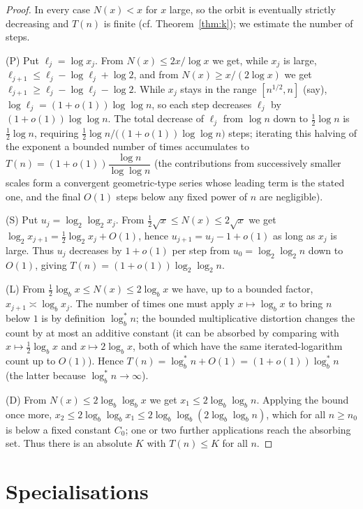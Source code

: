 \documentclass[12pt]{article}
\theoremstyle{definition}
\begin{document}
\begin{proof}
In every case $N(x)<x$ for $x$ large, so the orbit is eventually strictly decreasing
and $T(n)$ is finite (cf. Theorem~\ref{thm:k}); we estimate the number of steps.

(P) Put $\ell_j=\log x_j$. From $N(x)\le 2x/\log x$ we get, while $x_j$ is large,
$\ell_{j+1}\le \ell_j-\log\ell_j+\log2$, and from $N(x)\ge x/(2\log x)$ we get
$\ell_{j+1}\ge \ell_j-\log\ell_j-\log2$. While $x_j$ stays in the range
$[n^{1/2},n]$ (say), $\log\ell_j=(1+o(1))\log\log n$, so each step decreases
$\ell_j$ by $(1+o(1))\log\log n$. The total decrease of $\ell_j$ from $\log n$ down
to $\tfrac12\log n$ is $\tfrac12\log n$, requiring
$\tfrac12\log n/\bigl((1+o(1))\log\log n\bigr)$ steps; iterating this halving of the
exponent a bounded number of times accumulates to
$T(n)=(1+o(1))\dfrac{\log n}{\log\log n}$ (the contributions from successively smaller
scales form a convergent geometric-type series whose leading term is the stated one,
and the final $O(1)$ steps below any fixed power of $n$ are negligible).

(S) Put $u_j=\log_2\log_2 x_j$. From $\tfrac12\sqrt x\le N(x)\le2\sqrt x$ we get
$\log_2 x_{j+1}=\tfrac12\log_2 x_j+O(1)$, hence
$u_{j+1}=u_j-1+o(1)$ as long as $x_j$ is large. Thus $u_j$ decreases by $1+o(1)$ per
step from $u_0=\log_2\log_2 n$ down to $O(1)$, giving
$T(n)=(1+o(1))\log_2\log_2 n$.

(L) From $\tfrac12\log_b x\le N(x)\le2\log_b x$ we have, up to a bounded factor,
$x_{j+1}\asymp\log_b x_j$. The number of times one must apply $x\mapsto\log_b x$ to
bring $n$ below $1$ is by definition $\log^*_b n$; the bounded multiplicative
distortion changes the count by at most an additive constant (it can be absorbed by
comparing with $x\mapsto\tfrac12\log_b x$ and $x\mapsto2\log_b x$, both of which have
the same iterated-logarithm count up to $O(1)$). Hence $T(n)=\log^*_b n+O(1)
=(1+o(1))\log^*_b n$ (the latter because $\log^*_b n\to\infty$).

(D) From $N(x)\le2\log_b\log_b x$ we get $x_1\le2\log_b\log_b n$. Applying the bound
once more, $x_2\le 2\log_b\log_b x_1\le 2\log_b\log_b(2\log_b\log_b n)$, which for all
$n\ge n_0$ is below a fixed constant $C_0$; one or two further applications reach the
absorbing set. Thus there is an absolute $K$ with $T(n)\le K$ for all $n$.
\end{proof}

\section{Specialisations}
\end{document}
